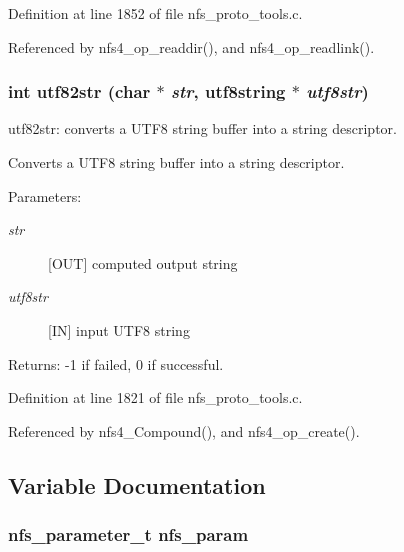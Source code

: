 Definition at line 1852 of file nfs\_\-proto\_\-tools.c.

Referenced by nfs4\_\-op\_\-readdir(), and nfs4\_\-op\_\-readlink().
\subsubsection{\setlength{\rightskip}{0pt plus 5cm}int utf82str (char $\ast$ {\em str}, utf8string $\ast$ {\em utf8str})}\label{nfs__proto__tools_8c_a13}


utf82str: converts a UTF8 string buffer into a string descriptor.

Converts a UTF8 string buffer into a string descriptor.

\begin{Desc}
\item[Parameters:]
\begin{description}
\item[{\em str}][OUT] computed output string \item[{\em utf8str}][IN] input UTF8 string\end{description}
\end{Desc}
\begin{Desc}
\item[Returns:]-1 if failed, 0 if successful. \end{Desc}


Definition at line 1821 of file nfs\_\-proto\_\-tools.c.

Referenced by nfs4\_\-Compound(), and nfs4\_\-op\_\-create().

\subsection{Variable Documentation}
\subsubsection{\setlength{\rightskip}{0pt plus 5cm}nfs\_\-parameter\_\-t {\bf nfs\_\-param}}\label{nfs__proto__tools_8c_a0}


